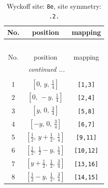 \documentclass[fleqn,8pt]{jsarticle}
\begin{document}
\renewcommand{\arraystretch}{1.2}
\begin{longtable}{ccc}
\caption{Wyckoff site: {\tt 8e}, site symmetry: {\tt .2.}}
 \\
 \hline \hline
No. & position & mapping \\ \hline \endfirsthead

\multicolumn{2}{l}{\tablename\ \thetable{}} \\
 \hline \hline
No. & position & mapping \\ \hline \endhead

 \hline \hline
\multicolumn{2}{r}{\footnotesize\it continued ...} \\ \endfoot

 \hline \hline
\multicolumn{2}{r}{} \\ \endlastfoot

1 & $\left[ 0,\, y,\, \frac{1}{4} \right]$ & {\tt [1,3]} \\ \hline
2 & $\left[ 0,\, - y,\, \frac{1}{4} \right]$ & {\tt [2,4]} \\ \hline
3 & $\left[ y,\, 0,\, \frac{3}{4} \right]$ & {\tt [5,8]} \\ \hline
4 & $\left[ - y,\, 0,\, \frac{3}{4} \right]$ & {\tt [6,7]} \\ \hline
5 & $\left[ \frac{1}{2},\, y + \frac{1}{2},\, \frac{1}{4} \right]$ & {\tt [9,11]} \\ \hline
6 & $\left[ \frac{1}{2},\, \frac{1}{2} - y,\, \frac{1}{4} \right]$ & {\tt [10,12]} \\ \hline
7 & $\left[ y + \frac{1}{2},\, \frac{1}{2},\, \frac{3}{4} \right]$ & {\tt [13,16]} \\ \hline
8 & $\left[ \frac{1}{2} - y,\, \frac{1}{2},\, \frac{3}{4} \right]$ & {\tt [14,15]} \\
\end{longtable}
\renewcommand{\arraystretch}{1.2}
\end{document}

